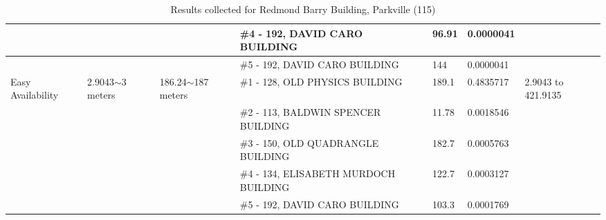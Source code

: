 \begin{table}[H]
{\begin{tabular}{|l|l|l|l|l|l|l|}
                   &                          &                                                 & \#4 - 192, DAVID CARO BUILDING                        & 96.91         & 0.0000041       &                           \\ \hline
                   &                          &                                                 & \#5 - 192, DAVID CARO BUILDING                        & 144           & 0.0000041       &                           \\ \hline
Easy Availability  & 2.9043$\sim$3 meters     & 186.24$\sim$187 meters                          & \#1 - 128, OLD PHYSICS BUILDING                       & 189.1         & 0.4835717       & 2.9043 to 421.9135        \\ \hline
                   &                          &                                                 & \#2 - 113, BALDWIN SPENCER BUILDING                   & 11.78         & 0.0018546       &                           \\ \hline
                   &                          &                                                 & \#3 - 150, OLD QUADRANGLE BUILDING                    & 182.7         & 0.0005763       &                           \\ \hline
                   &                          &                                                 & \#4 - 134, ELISABETH MURDOCH BUILDING                 & 122.7         & 0.0003127       &                           \\ \hline
                   &                          &                                                 & \#5 - 192, DAVID CARO BUILDING                        & 103.3         & 0.0001769       &                           \\ \hline
\end{tabular}
}
\caption{Results collected for Redmond Barry Building, Parkville (115)}
\label{appendix:red_tr}
\end{table}


